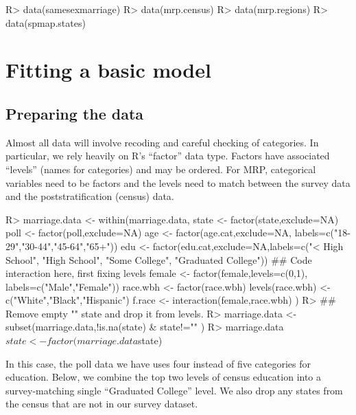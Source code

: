 \documentclass[11pt]{article} %
\begin{document}
\begin{Schunk}
\begin{Sinput}
R> data(samesexmarriage)
R> data(mrp.census)
R> data(mrp.regions)
R> data(spmap.states)
\end{Sinput}
\end{Schunk}

\section{Fitting a basic model}
\label{sec:fitting-basic-model}

\subsection{Preparing the data}
\label{sec:preparing-data}

Almost all data will involve recoding and careful checking of categories. In particular, we rely heavily on R's “factor” data type. Factors have associated “levels” (names for categories) and may be ordered. For MRP, categorical variables need to be factors and the levels need to match between the survey data and the poststratification (census) data.

\begin{Schunk}
\begin{Sinput}
R> marriage.data <- within(marriage.data, {
       state <- factor(state,exclude=NA)
       poll <- factor(poll,exclude=NA)
       age <- factor(age.cat,exclude=NA,
                     labels=c("18-29","30-44","45-64","65+"))
       edu <- factor(edu.cat,exclude=NA,labels=c("< High School",
                                          "High School",
                                          "Some College",
                                          "Graduated College"))
       ## Code interaction here, first fixing levels
       female <- factor(female,levels=c(0,1),
                        labels=c("Male","Female"))
       race.wbh <- factor(race.wbh)
       levels(race.wbh) <- c("White","Black","Hispanic")
       f.race <- interaction(female,race.wbh)
     })
R>   ## Remove empty "" state and drop it from levels.
R>   marriage.data <- subset(marriage.data,!is.na(state) & state!="" )
R>   marriage.data$state <- factor(marriage.data$state)
\end{Sinput}
\end{Schunk}

In this case, the poll data we have uses four instead of five categories for education. Below, we combine the top two levels of census education into a survey-matching single “Graduated College” level. We also drop any states from the census that are not in our survey dataset.
\end{document}

